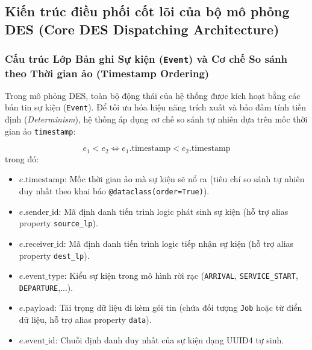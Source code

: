 \newpage
\subsection{Kiến trúc điều phối cốt lõi của bộ mô phỏng DES (Core DES Dispatching Architecture)}
\label{subsec:core-des-engine}
\subsubsection{Cấu trúc Lớp Bản ghi Sự kiện (\texttt{Event}) và Cơ chế So sánh theo Thời gian ảo (Timestamp Ordering)}
\label{subsubsec:event-structure}

\hspace{0.5cm}Trong mô phỏng DES, toàn bộ động thái của hệ thống được kích hoạt bằng các bản tin sự kiện (\texttt{Event}). Để tối ưu hóa hiệu năng trích xuất và bảo đảm tính tiền định (\textit{Determinism}), hệ thống áp dụng cơ chế so sánh tự nhiên dựa trên mốc thời gian ảo \texttt{timestamp}:

\begin{equation}
e_1 < e_2 \iff e_1.\text{timestamp} < e_2.\text{timestamp}
\end{equation}
trong đó:
\begin{itemize}[leftmargin=2em, itemsep=1pt]
\item $e.\text{timestamp}$: Mốc thời gian ảo mà sự kiện sẽ nổ ra (tiêu chí so sánh tự nhiên duy nhất theo khai báo \texttt{@dataclass(order=True)}).
\item $e.\text{sender\_id}$: Mã định danh tiến trình logic phát sinh sự kiện (hỗ trợ alias property \texttt{source\_lp}).
\item $e.\text{receiver\_id}$: Mã định danh tiến trình logic tiếp nhận sự kiện (hỗ trợ alias property \texttt{dest\_lp}).
\item $e.\text{event\_type}$: Kiểu sự kiện trong mô hình rời rạc (\texttt{ARRIVAL}, \texttt{SERVICE\_START}, \texttt{DEPARTURE},...).
\item $e.\text{payload}$: Tải trọng dữ liệu đi kèm gói tin (chứa đối tượng \texttt{Job} hoặc từ điển dữ liệu, hỗ trợ alias property \texttt{data}).
\item $e.\text{event\_id}$: Chuỗi định danh duy nhất của sự kiện dạng UUID4 tự sinh.
\end{itemize}


